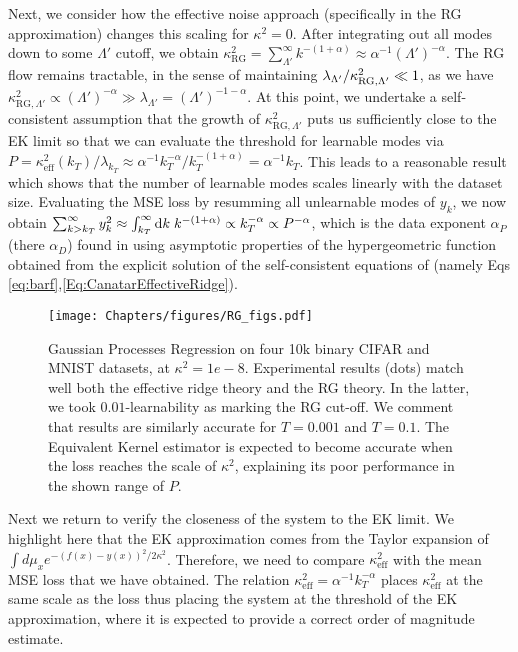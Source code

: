 Next, we consider how the effective noise approach (specifically in the RG approximation) changes this scaling for $\kappa^2=0$. After integrating out all modes down to some $\Lambda'$ cutoff, we obtain $\kappa^2_{\text{RG}}=\sum_{\Lambda'}^{\infty} k^{-(1+\alpha)} \approx \alpha^{-1} (\Lambda')^{-\alpha}$. The RG flow remains tractable, in the sense of maintaining $\lambda_{\Lambda'}/\kappa^2_{\text{RG},\Lambda'} \ll 1$, as we have $\kappa^2_{\text{RG},\Lambda'} \propto (\Lambda')^{-\alpha} \gg \lambda_{\Lambda'}=(\Lambda')^{-1-\alpha}$. At this point, we undertake a self-consistent assumption that the growth of $\kappa_{\text{RG},\Lambda'}^2$ puts us sufficiently close to the EK limit so that we can evaluate the threshold for learnable modes via $P=\kappa_{\text{eff}}^2(k_T)/\lambda_{k_T}\approx \alpha^{-1} k_T^{-\alpha}/k_T^{-(1+\alpha)}=\alpha^{-1}k_T$. This leads to a reasonable result which shows that the number of learnable modes scales linearly with the dataset size. Evaluating the MSE loss by resumming all unlearnable modes of $y_k$, we now obtain $\sum_{k > k_T}^{\infty} y^2_k \approx \int_{k_T}^{\infty} \text{d} k \; k^{-(1+\alpha)} \propto k_T^{-\alpha} \propto P^{-\alpha}$, which is the data exponent $\alpha_P$ (there $\alpha_D$) found in \cite{Bahri2024Explaining} using asymptotic properties of the hypergeometric function obtained from the explicit solution of the self-consistent equations of \cite{Canatar2021} (namely Eqs \ref{eq:barf},\ref{Eq:CanatarEffectiveRidge}).
\begin{figure}
    \centering
    \texttt{[image: Chapters/figures/RG\_figs.pdf]}
    \vspace{-2cm}
    \caption{Gaussian Processes Regression on four 10k binary CIFAR and MNIST datasets, at $\kappa^2=1e-8$. Experimental results (dots) match well both the effective ridge theory and the RG theory. In the latter, we took $0.01$-learnability as marking the RG cut-off. We comment that results are similarly accurate for $T=0.001$ and $T=0.1$. The Equivalent Kernel estimator is expected to become accurate when the loss reaches the scale of $\kappa^2$, explaining its poor performance in the shown range of $P$. }
    \label{fig:RG_CIFAR_MNIST}
\end{figure}

Next we return to verify the closeness of the system to the EK limit. We highlight here that the EK approximation comes from the Taylor expansion of $\int d\mu_x e^{-(f(x)-y(x))^2/2\kappa^2}$. Therefore, we need to compare $\kappa_{\text{eff}}^2$ with the mean MSE loss that we have obtained. The relation $\kappa_{\text{eff}}^2=\alpha^{-1} k_T^{-\alpha}$ places $\kappa^2_{\text{eff}}$ at the same scale as the loss thus placing the system at the threshold of the EK approximation, where it is expected to provide a correct order of magnitude estimate. 

